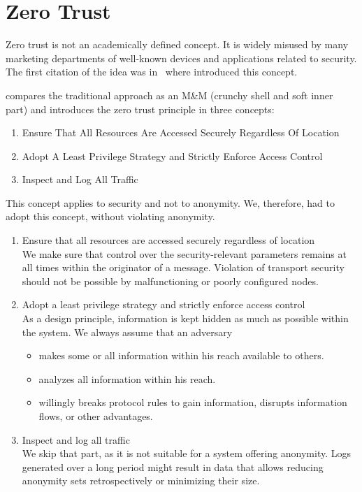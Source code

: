 \section{Zero Trust}\label{sec:zeroTrust}
Zero trust is not an academically defined concept. It is widely misused by many marketing departments of well-known devices and applications related to security. The first citation of the idea was in~\cite{kindervag2010no} where \citeauthor{kindervag2010no} introduced this concept.

\citeauthor{kindervag2010no} compares the traditional approach as an M\&M (crunchy shell and soft inner part) and introduces the zero trust principle in three concepts:
\begin{shadequote}{}
	\begin{enumerate}
		\item Ensure That All Resources Are Accessed Securely Regardless Of Location
		\item Adopt A Least Privilege Strategy and Strictly Enforce Access Control
		\item Inspect and Log All Traffic
	\end{enumerate}
\end{shadequote}

This concept applies to security and not to anonymity. We, therefore, had to adopt this concept, without violating anonymity.
\begin{enumerate}
	\item Ensure that all resources are accessed securely regardless of location\\
	We make sure that control over the security-relevant parameters remains at all times within the originator of a message. Violation of transport security should not be possible by malfunctioning or poorly configured nodes.
	\item Adopt a least privilege strategy and strictly enforce access control\\
	As a design principle, information is kept hidden as much as possible within the system. We always assume that an adversary
	\begin{itemize}
		\item makes some or all information within his reach available to others.
		\item analyzes all information within his reach.
		\item willingly breaks protocol rules to gain information, disrupts information flows, or other advantages.
	\end{itemize}		
	\item Inspect and log all traffic\\
	We skip that part, as it is not suitable for a system offering anonymity. Logs generated over a long period might result in data that allows reducing anonymity sets retrospectively or minimizing their size.
	
\end{enumerate}

